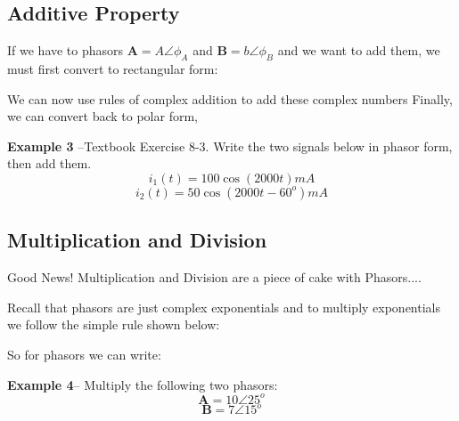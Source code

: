\documentclass{handout}
\begin{document}
\subsection{Additive Property}
If we have to phasors $\mathbf{A} = A\angle\phi_A$ and $\mathbf{B} = b\angle\phi_B$ and we want to add them, we must first convert to rectangular form:
\soln{2in}{
\[
A\angle\phi_A = A\cos\phi_A + jA\sin\phi_A
\]
\[
B\angle\phi_B = B\cos\phi_B + jB\sin\phi_B
\]
}

We can now use rules of complex addition to add these complex numbers
\soln{1in}{
\[
\mathbf{A} +\mathbf{B} = \left[A\cos\phi_A +B\cos\phi_B \right] +j\left[A\sin\phi_A+ B\sin\phi_B \right]
\]
}
Finally, we can convert back to polar form,

\textbf{Example 3} --Textbook Exercise 8-3.  Write the two signals below in phasor form, then add them.
\[i_1(t) = 100\cos\left(2000t\right)mA\]
\[i_2(t) = 50\cos\left(2000t-60^o\right)mA\]

\newpage
\clearpage
\pagebreak
\subsection{Multiplication and Division}
Good News!  Multiplication and Division are a piece of cake with Phasors....

Recall that phasors are just complex exponentials and to multiply exponentials we follow the simple rule shown below:
\soln{1in}{
\[
Ae^{j\phi_A} \times Be^{j\phi_B} = ABe^{j(\phi_A+\phi_B)}
\]
}

So for phasors we can write:
\soln{1in}{
\[
A\angle\phi_A \times B\angle \phi_B = AB \angle \left( \phi_A +\phi_B \right)
\]
}

\textbf{Example 4}-- Multiply the following two phasors:
\[
\mathbf{A} = 10\angle 25^o
\]
\[
\mathbf{B} = 7\angle 15^o
\]
\soln{3in}{
\[
\mathbf{AB} = 7 \times 10 \angle \left( 25^o + 15^o\right) = 70\angle 40^o
\]
}
\end{document}
